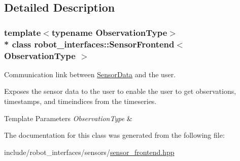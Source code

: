 \subsection{Detailed Description}
\subsubsection*{template$<$typename Observation\+Type$>$\\*
class robot\+\_\+interfaces\+::\+Sensor\+Frontend$<$ Observation\+Type $>$}

Communication link between \hyperlink{classrobot__interfaces_1_1SensorData}{Sensor\+Data} and the user. 

Exposes the sensor data to the user to enable the user to get observations, timestamps, and timeindices from the timeseries.


\begin{DoxyTemplParams}{Template Parameters}
{\em Observation\+Type} & \\
\hline
\end{DoxyTemplParams}


The documentation for this class was generated from the following file\+:\begin{DoxyCompactItemize}
\item 
include/robot\+\_\+interfaces/sensors/\hyperlink{sensor__frontend_8hpp}{sensor\+\_\+frontend.\+hpp}\end{DoxyCompactItemize}
